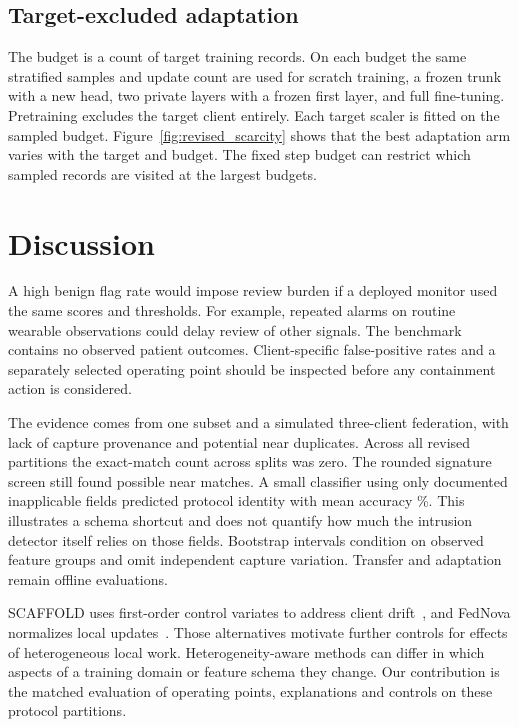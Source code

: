 \documentclass[nolineno]{ieeeaccess}
\begin{document}
\RevisionSensitivity
\RevisionTransfer
\subsection{Target-excluded adaptation}
The budget is a count of target training records. On each budget the same stratified samples and update count are used for scratch training, a frozen trunk with a new head, two private layers with a frozen first layer, and full fine-tuning. Pretraining excludes the target client entirely. Each target scaler is fitted on the sampled budget. Figure~\ref{fig:revised_scarcity} shows that the best adaptation arm varies with the target and budget. The fixed step budget can restrict which sampled records are visited at the largest budgets.



\RevisionScarcity
\clearpage
\section{Discussion}\label{sec:discussion}
A high benign flag rate would impose review burden if a deployed monitor used the same scores and thresholds. For example, repeated alarms on routine wearable observations could delay review of other signals. The benchmark contains no observed patient outcomes. Client-specific false-positive rates and a separately selected operating point should be inspected before any containment action is considered.

The evidence comes from one subset and a simulated three-client federation, with lack of capture provenance and potential near duplicates. Across all revised partitions the exact-match count across splits was zero. The rounded signature screen still found possible near matches. A small classifier using only documented inapplicable fields predicted protocol identity with mean accuracy \RevisionShortcut\%. This illustrates a schema shortcut and does not quantify how much the intrusion detector itself relies on those fields. Bootstrap intervals condition on observed feature groups and omit independent capture variation. Transfer and adaptation remain offline evaluations.

SCAFFOLD uses first-order control variates to address client drift~\cite{karimireddy2020scaffold}, and FedNova normalizes local updates~\cite{wang2020tackling}. Those alternatives motivate further controls for effects of heterogeneous local work. Heterogeneity-aware methods can differ in which aspects of a training domain or feature schema they change. Our contribution is the matched evaluation of operating points, explanations and controls on these protocol partitions.
\end{document}
